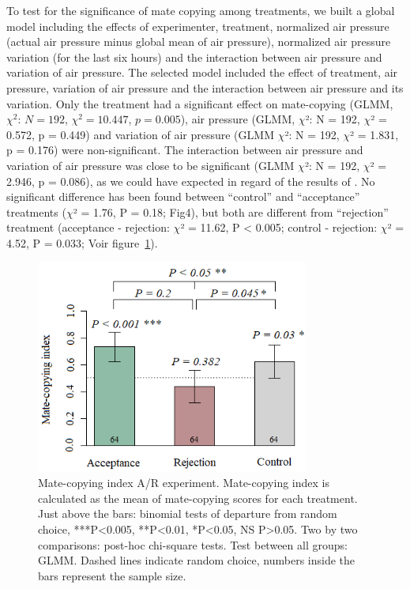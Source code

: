\documentclass[a4paper, 12pt]{article}
\begin{document}
	To test for the significance of mate copying among treatments, we built a global model including the effects of experimenter, treatment, normalized air pressure (actual air pressure minus global mean of air pressure), normalized air pressure variation (for the last six hours) and the interaction between air pressure and variation of air pressure. The selected model included the effect of treatment, air pressure, variation of air pressure and the interaction between air pressure and its variation. Only the treatment had a significant effect on mate-copying (GLMM, $\chi^2$: $N = 192$, $\chi^2 = 10.447$, $p = 0.005$), air pressure (GLMM, $\chi $²: N = 192, $\chi $² = 0.572, p = 0.449) and variation of air pressure (GLMM $\chi $²: N = 192, $\chi $² = 1.831, p = 0.176) were non-significant. The interaction between air pressure and variation of air pressure was close to be significant (GLMM $\chi $²: N = 192, $\chi $² = 2.946, p = 0.086), as we could have expected in regard of the results of \textcite{dagaeff_drosophila_2016}. No significant difference has been found between ``control'' and ``acceptance'' treatments ($\chi $² = 1.76, P = 0.18; Fig4), but both are different from ``rejection'' treatment (acceptance - rejection: $\chi $² = 11.62, P {\textless} 0.005; control - rejection: $\chi $² = 4.52, P = 0.033; Voir figure~\ref{fig:mcsar}).
	
	\clearpage
		\begin{figure}
		\centering
		\includegraphics[width=0.8\textwidth]{images/mcsar}
		\caption{Mate-copying index A/R experiment. Mate-copying index is calculated as the mean of mate-copying scores for each treatment. Just above the bars: binomial tests of departure from random choice, ***P<0.005, **P<0.01, *P<0.05, NS P>0.05. Two by two comparisons: post-hoc chi-square tests. Test between all groups: GLMM. Dashed lines indicate random choice, numbers inside the bars represent the sample size.}
		\label{fig:mcsar}
	\end{figure}
\clearpage
\end{document}
